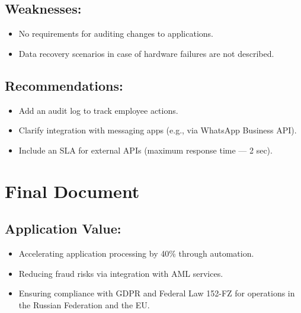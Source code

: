 \documentclass[a4paper,12pt]{article}
\begin{document}
\subsection*{Weaknesses:}
\begin{itemize}
    \item No requirements for auditing changes to applications.
    \item Data recovery scenarios in case of hardware failures are not described.
\end{itemize}

\subsection*{Recommendations:}
\begin{itemize}
    \item Add an audit log to track employee actions.
    \item Clarify integration with messaging apps (e.g., via WhatsApp Business API).
    \item Include an SLA for external APIs (maximum response time — 2 sec).
\end{itemize}

\section*{Final Document}

\subsection*{Application Value:}
\begin{itemize}
    \item Accelerating application processing by 40\% through automation.
    \item Reducing fraud risks via integration with AML services.
    \item Ensuring compliance with GDPR and Federal Law 152-FZ for operations in the Russian Federation and the EU.
\end{itemize}
\end{document}
